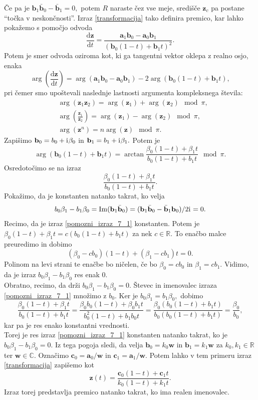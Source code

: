 \documentclass[12pt,a4paper,twoside]{article}
\newcommand{\iu}{\mathrm{i}\mkern1mu} %
\theoremstyle{definition} %
\theoremstyle{plain} %
\theoremstyle{primerstyle}
\numberwithin{equation}{section}  %
\newcommand{\R}{\mathbb R}
\renewcommand{\C}{\mathbb C}
\newcommand{\aV}{\mathbf{a}}
\newcommand{\bV}{\mathbf{b}}
\newcommand{\cV}{\mathbf{c}}
\newcommand{\wV}{\mathbf{w}}
\newcommand{\zV}{\mathbf{z}}
\newcommand{\dFrac}[2][t]{\frac{\mathrm{d}#2}{\mathrm{d}#1}} %
\DeclareMathOperator{\ImC}{Im}
\begin{document}
Če pa je $\bV_1\bar{\bV}_0-\bar{\bV}_1=0,$ potem $R$ naraste čez vse meje, središče $\zV_c$ pa postane ``točka v neskončnosti''. Izraz \eqref{transformacija} tako definira premico, kar lahko pokažemo s pomočjo odvoda
\begin{equation*}
	\dFrac{\zV}=\frac{\aV_1\bV_0-\aV_0\bV_1}{(\bV_0(1-t)+\bV_1t)^2}.
\end{equation*}
Potem je smer odvoda oziroma kot, ki ga tangentni vektor oklepa z realno osjo, enaka
\begin{equation*}
	\arg\left(\dFrac{\zV}\right)=\arg(\aV_1\bV_0-\aV_0\bV_1)-2\arg(\bV_0(1-t)+\bV_1t),
\end{equation*}
pri čemer smo upoštevali naslednje lastnosti argumenta kompleksnega števila:
\begin{align}
	&\arg(\zV_1\zV_2)=\arg(\zV_1)+\arg(\zV_2)\mod\pi,\nonumber\\
	&\arg(\frac{\zV_1}{\zV_2})=\arg(\zV_1)-\arg(\zV_2)\mod\pi,\label{lastnosti_argumenta_C}\\
	&\arg(\zV^n)=n\arg(\zV)\mod\pi.\nonumber
\end{align}
Zapišimo $\bV_0=b_0+\iu\beta_0$ in $\bV_1=b_1+\iu\beta_1.$ Potem je
\begin{equation*}
	\arg(\bV_0(1-t)+\bV_1t)=\arctan\frac{\beta_0(1-t)+\beta_1t}{b_0(1-t)+b_1t}\mod\pi.
\end{equation*}
Osredotočimo se na izraz
\begin{equation}
	\label{pomozni_izraz_7_1}
	\frac{\beta_0(1-t)+\beta_1t}{b_0(1-t)+b_1t}.
\end{equation}
Pokažimo, da je konstanten natanko takrat, ko  velja $$b_0\beta_1-b_1\beta_0=\ImC(\bV_1\bar{\bV}_0)=(\bV_1\bar{\bV}_0-\bar{\bV}_1\bV_0)/2\iu=0.$$ Recimo, da je izraz \eqref{pomozni_izraz_7_1} konstanten. Potem je $\beta_0(1-t)+\beta_1t=c(b_0(1-t)+b_1t)$ za nek $c\in\R.$ To enačbo malce preuredimo in dobimo
\begin{equation*}
	(\beta_0-cb_0)(1-t)+(\beta_1-cb_1)t=0.
\end{equation*}
Polinom na levi strani te enačbe bo ničelen, če bo $\beta_0=cb_0$ in $\beta_1=cb_1.$ Vidimo, da je izraz $b_0\beta_1-b_1\beta_0$ res enak 0.\\
Obratno, recimo, da drži $b_0\beta_1-b_1\beta_0=0.$ Števec in imenovalec izraza \eqref{pomozni_izraz_7_1} množimo z $b_0.$ Ker je $b_0\beta_1=b_1\beta_0,$ dobimo
\begin{equation*}
	\frac{\beta_0(1-t)+\beta_1t}{b_0(1-t)+b_1t}=\frac{\beta_0b_0(1-t)+\beta_0b_1t}{b_0^2(1-t)+b_1b_0t}=\frac{\beta_0(b_0(1-t)+b_1t)}{b_0(b_0(1-t)+b_1t)}=\frac{\beta_0}{b_0},
\end{equation*}
kar pa je res enako konstantni vrednosti.\\
Torej je res izraz \eqref{pomozni_izraz_7_1} konstanten natanko takrat, ko je $b_0\beta_1-b_1\beta_0=0.$ Iz tega pogoja sledi, da velja $\bV_0=k_0\wV$ in $\bV_1=k_1\wV$ za $k_0,k_1\in\R$ ter $\wV\in\C.$ Označimo $\cV_0=\aV_0/\wV$ in $\cV_1=\aV_1/\wV.$ Potem lahko v tem primeru izraz \eqref{transformacija} zapišemo kot
\begin{equation*}
	\zV(t)=\frac{\cV_0(1-t)+\cV_1t}{k_0(1-t)+k_1t}.
\end{equation*}
Izraz torej predstavlja premico natanko takrat, ko ima realen imenovalec.
\end{document}
